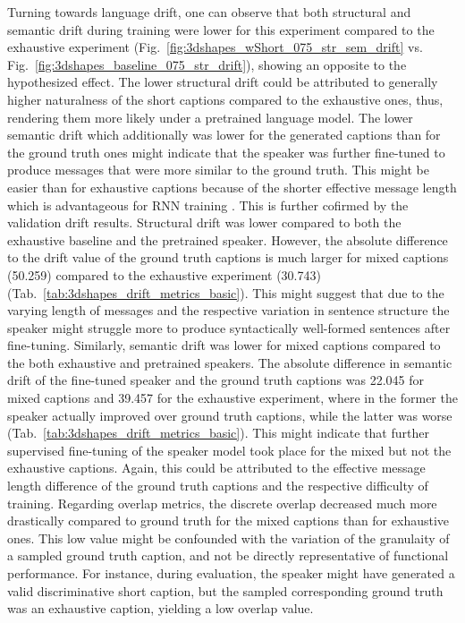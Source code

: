 Turning towards language drift, one can observe that both structural and semantic drift during training were lower for this experiment compared to the exhaustive experiment (Fig.~\ref{fig:3dshapes_wShort_075_str_sem_drift} vs. Fig.~\ref{fig:3dshapes_baseline_075_str_drift}), showing an opposite to the hypothesized effect. The lower structural drift could be attributed to generally higher naturalness of the short captions compared to the exhaustive ones, thus, rendering them more likely under a pretrained language model. The lower semantic drift which additionally was lower for the generated captions than for the ground truth ones might indicate that the speaker was further fine-tuned to produce messages that were more similar to the ground truth. This might be easier than for exhaustive captions because of the shorter effective message length which is advantageous for RNN training \parencite[cf.][]{jaeger2002tutorial}. This is further cofirmed by the validation drift results. Structural drift was lower compared to both the exhaustive baseline and the pretrained speaker. However, the absolute difference to the drift value of the ground truth captions is much larger for mixed captions (50.259) compared to the exhaustive experiment (30.743) (Tab.~\ref{tab:3dshapes_drift_metrics_basic}). This might suggest that due to the varying length of messages and the respective variation in sentence structure the speaker might struggle more to produce syntactically well-formed sentences after fine-tuning. 
Similarly, semantic drift was lower for mixed captions compared to the both exhaustive and pretrained speakers. The absolute difference in semantic drift of the fine-tuned speaker and the ground truth captions was 22.045 for mixed captions and 39.457 for the exhaustive experiment, where in the former the speaker actually improved over ground truth captions, while the latter was worse (Tab.~\ref{tab:3dshapes_drift_metrics_basic}). This might indicate that further supervised fine-tuning of the speaker model took place for the mixed but not the exhaustive captions. Again, this could be attributed to the effective message length difference of the ground truth captions and the respective difficulty of training.
Regarding overlap metrics, the discrete overlap decreased much more drastically compared to ground truth for the mixed captions than for exhaustive ones. This low value might be confounded with the variation of the granulaity of a sampled ground truth caption, and not be directly representative of functional performance. For instance, during evaluation, the speaker might have generated a valid discriminative short caption, but the sampled corresponding ground truth was an exhaustive caption, yielding a low overlap value.   

